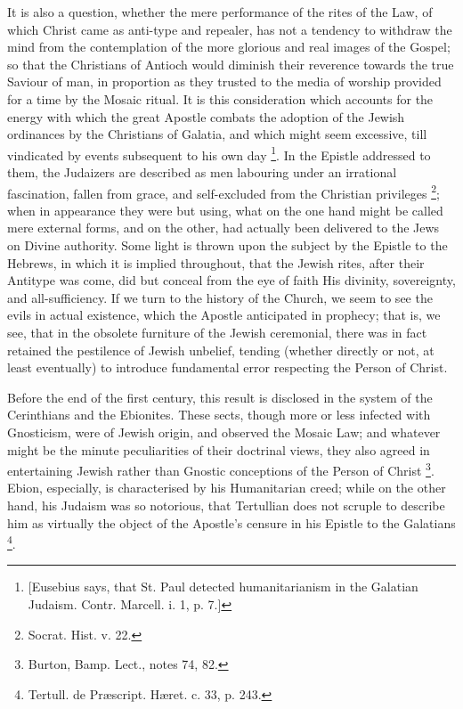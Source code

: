 It is also a question, whether the mere performance of the rites of
the Law, of which Christ came as anti-type and repealer, has not a
tendency to withdraw the mind from the contemplation of the more
glorious and real images of the Gospel; so that the Christians of
Antioch would diminish their reverence towards the true Saviour of
man, in proportion as they trusted to the media of worship provided
for a time by the Mosaic ritual. It is this consideration which
accounts for the energy with which the great Apostle combats the
adoption of the Jewish ordinances by the Christians of Galatia, and
which might seem excessive, till vindicated by events subsequent to
his own day \footnote{[Eusebius says, that St. Paul detected
humanitarianism in the Galatian Judaism. Contr. Marcell. i. 1, p. 7.]}. In the
Epistle addressed to them, the Judaizers are described as men
labouring under an irrational fascination, fallen from grace, and
self-excluded from the Christian privileges \footnote{Socrat. Hist. v. 22.}; when in appearance they were but using, what on the one hand
might be called mere external forms, and on the other, had actually
been delivered to the Jews on Divine authority. Some light is thrown
upon the subject by the Epistle to the Hebrews, in which it is implied
throughout, that the Jewish rites, after their Antitype was come, did
but conceal from the eye of faith His divinity, sovereignty, and
all-sufficiency. If we turn to the history of the Church, we seem to
see the evils in actual existence, which the Apostle anticipated in
prophecy; that is, we see, that in the obsolete furniture of the
Jewish ceremonial, there was in fact retained the pestilence of Jewish
unbelief, tending (whether directly or not, at least eventually) to
introduce fundamental error respecting the Person of Christ.

Before the end of the first century, this result is disclosed in
the system of the Cerinthians and the Ebionites. These sects, though
more or less infected with Gnosticism, were of Jewish origin, and
observed the Mosaic Law; and whatever might be the minute
peculiarities of their doctrinal views, they also agreed in
entertaining Jewish rather than Gnostic conceptions of the Person of
Christ \footnote{Burton, Bamp. Lect., notes 74, 82.}. Ebion,
especially, is characterised by his Humanitarian creed; while on the
other hand, his Judaism was so notorious, that Tertullian does not
scruple to describe him as virtually the object of the Apostle's
censure in his Epistle to the Galatians \footnote{Tertull. de Præscript. Hæret. c. 33, p.
243.}.

